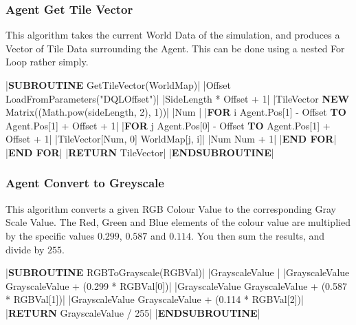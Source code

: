\begin{flushleft}
            \subsubsection{Agent Get Tile Vector}
                This algorithm takes the current World Data of the simulation, and produces a Vector of Tile Data surrounding the Agent. This can
                be done using a nested For Loop rather simply.

                \vspace{0.2cm}
                \begin{pseudocode}
|\textbf{SUBROUTINE} GetTileVector(WorldMap)|
    |Offset \leftarrow LoadFromParameters("DQLOffset")|
    |SideLength  * Offset + 1|
    |TileVector \leftarrow \textbf{NEW} Matrix((Math.pow(sideLength, 2), 1))|
    |Num |
    |\textbf{FOR} i \leftarrow Agent.Pos[1] - Offset \textbf{TO} Agent.Pos[1] + Offset + 1|
        |\textbf{FOR} j \leftarrow Agent.Pos[0] - Offset \textbf{TO} Agent.Pos[1] + Offset + 1|
            |TileVector[Num, 0] \leftarrow WorldMap[j, i]|
            |Num \leftarrow Num + 1|
        |\textbf{END FOR}|
    |\textbf{END FOR}|
    |\textbf{RETURN} TileVector|
|\textbf{ENDSUBROUTINE}|
                \end{pseudocode}
                
                \vspace{0.5cm}
            \subsubsection{Agent Convert to Greyscale}
                This algorithm converts a given RGB Colour Value to the corresponding Gray Scale Value. The Red, Green and Blue elements of
                the colour value are multiplied by the specific values $0.299$, $0.587$ and $0.114$. You then sum the results, and divide by 
                $255$.

                \vspace{0.2cm}
                \begin{pseudocode}
|\textbf{SUBROUTINE} RGBToGrayscale(RGBVal)|
    |GrayscaleValue |
    |GrayscaleValue \leftarrow GrayscaleValue + (0.299 * RGBVal[0])|
    |GrayscaleValue \leftarrow GrayscaleValue + (0.587 * RGBVal[1])|
    |GrayscaleValue \leftarrow GrayscaleValue + (0.114 * RGBVal[2])|
    |\textbf{RETURN} GrayscaleValue / 255|
|\textbf{ENDSUBROUTINE}|
                \end{pseudocode}


\end{flushleft}
